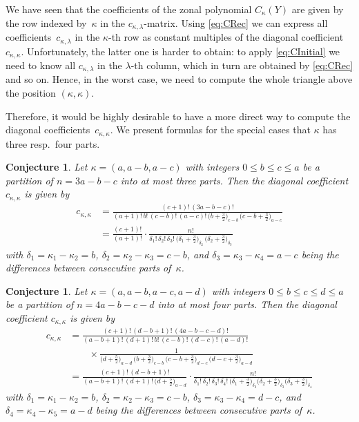 \documentclass[10pt,oneside,american]{amsart}
\numberwithin{equation}{section}
\numberwithin{figure}{section}
\theoremstyle{plain}
\theoremstyle{definition}
\theoremstyle{remark}
\theoremstyle{plain}
\theoremstyle{definition}
\theoremstyle{plain}
\theoremstyle{plain}
\newtheorem{conj}[thm]{Conjecture}
\begin{document}
We have seen that the coefficients of the zonal polynomial $C_\kappa(Y)$ are
given by the row indexed by~$\kappa$ in the $c_{\kappa,\lambda}$-matrix. Using
\eqref{eq:CRec} we can express all coefficients~$c_{\kappa,\lambda}$ in the
$\kappa$-th row as constant multiples of the diagonal
coefficient~$c_{\kappa,\kappa}$.  Unfortunately, the latter one is harder to
obtain: to apply \eqref{eq:CInitial} we need to know all $c_{\kappa,\lambda}$
in the $\lambda$-th column, which in turn are obtained by \eqref{eq:CRec} and
so on. Hence, in the worst case, we need to compute the whole triangle above
the position $(\kappa,\kappa)$.

Therefore, it would be highly desirable to have a more direct way to compute
the diagonal coefficients~$c_{\kappa,\kappa}$. We present formulas for the
special cases that $\kappa$ has three resp.\ four parts.

\begin{conj}\label{conj:diag3}
  Let $\kappa=(a,a-b,a-c)$ with integers $0\leq b\leq c\leq a$ be a partition
  of $n=3a-b-c$ into at most three parts. Then the diagonal coefficient
  $c_{\kappa,\kappa}$ is given by
  \begin{align*}
    c_{\kappa,\kappa} &= \frac{(c+1)! \, (3a-b-c)!}
    {(a+1)! \, b! \, (c-b)! \, (a-c)! \, \bigl(b+\frac32\bigr)_{\!c-b} \, \bigl(c-b+\frac32\bigr)_{\!a-c}} \\
    &= \frac{(c+1)!}{(a+1)!} \cdot \frac{n!}{\delta_1! \, \delta_2! \, \delta_3! \,
      \bigl(\delta_1+\frac32\bigr)_{\!\delta_2} \, \bigl(\delta_2+\frac32\bigr)_{\!\delta_3}}
  \end{align*}
  with $\delta_1=\kappa_1-\kappa_2=b$, $\delta_2=\kappa_2-\kappa_3=c-b$, and
  $\delta_3=\kappa_3-\kappa_4=a-c$ being the differences between consecutive
  parts of~$\kappa$.
\end{conj}

\begin{conj}\label{conj:diag4}
  Let $\kappa=(a,a-b,a-c,a-d)$ with integers $0\leq b\leq c\leq d\leq a$ be a
  partition of $n=4a-b-c-d$ into at most four parts. Then the diagonal
  coefficient $c_{\kappa,\kappa}$ is given by
  \begin{align*}
    c_{\kappa,\kappa} &= \frac{(c+1)! \, (d-b+1)! \, (4a-b-c-d)!}
    {(a-b+1)! \, (d+1)! \, b! \, (c-b)! \, (d-c)! \, (a-d)!} \\
    &\qquad\times\frac{1}{
      \bigl(d+\frac52\bigr)_{\!a-d} \, \bigl(b+\frac32\bigr)_{\!c-b} \, 
      \bigl(c-b+\frac32\bigr)_{\!d-c} \, \bigl(d-c+\frac32\bigr)_{\!a-d}} \\
    &= \frac{(c+1)! \, (d-b+1)!}{(a-b+1)! \, (d+1)! \,  \bigl(d+\frac52\bigr)_{\!a-d}}
    \cdot \frac{n!}{\delta_1! \, \delta_2! \, \delta_3! \, \delta_4! \,
      \bigl(\delta_1+\frac32\bigr)_{\!\delta_2} \bigl(\delta_2+\frac32\bigr)_{\!\delta_3} \bigl(\delta_3+\frac32\bigr)_{\!\delta_4}}
  \end{align*}
  with $\delta_1=\kappa_1-\kappa_2=b$, $\delta_2=\kappa_2-\kappa_3=c-b$,
  $\delta_3=\kappa_3-\kappa_4=d-c$, and $\delta_4=\kappa_4-\kappa_5=a-d$ being
  the differences between consecutive parts of~$\kappa$.
\end{conj}
\end{document}
